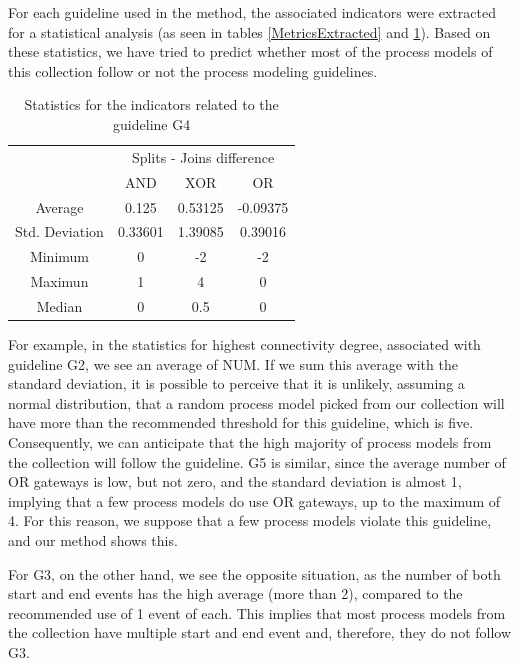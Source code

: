 \documentclass[a4paper,twoside]{article}
\begin{document}
For each guideline used in the method, the associated indicators were extracted for a statistical analysis (as seen in tables \ref{MetricsExtracted} and \ref{MetricsGateways}). Based on these statistics, we have tried to predict whether most of the process models of this collection follow or not the process modeling guidelines. 



\begin{table}[]
	\centering
	\caption{Statistics for the indicators related to the guideline G4}
	\label{MetricsGateways}
	\begin{tabular}{|c|c|c|c|}
		\hline
		\multirow{2}{*}{}  & \multicolumn{3}{c|}{Splits - Joins difference} \\ \cline{2-4} 
		& AND            & XOR           & OR            \\ \hline
		Average            & 0.125          & 0.53125       & -0.09375      \\ \hline
		Std. Deviation & 0.33601   & 1.39085   & 0.39016   \\ \hline
		Minimum            & 0              & -2            & -2            \\ \hline
		Maximun            & 1              & 4             & 0             \\ \hline
		Median             & 0              & 0.5           & 0             \\ \hline
	\end{tabular}
\end{table}

For example, in the statistics for highest connectivity degree, associated with guideline G2, we see an average of NUM. If we sum this average with the standard deviation, it is possible to perceive that it is unlikely, assuming a normal distribution, that a random process model picked from our collection will have more than the recommended threshold for this guideline, which is five. Consequently, we can anticipate that the high majority of process models from the collection will follow the guideline. G5 is similar, since the average number of OR gateways is low, but not zero, and the standard deviation is almost 1, implying that a few process models do use OR gateways, up to the maximum of 4. For this reason, we suppose that a few process models violate this guideline, and our method shows this.

For G3, on the other hand, we see the opposite situation, as the number of both start and end events has the high average (more than 2), compared to the recommended use of 1 event of each. This implies that most process models from the collection have multiple start and end event and, therefore, they do not follow G3. 
\end{document}
